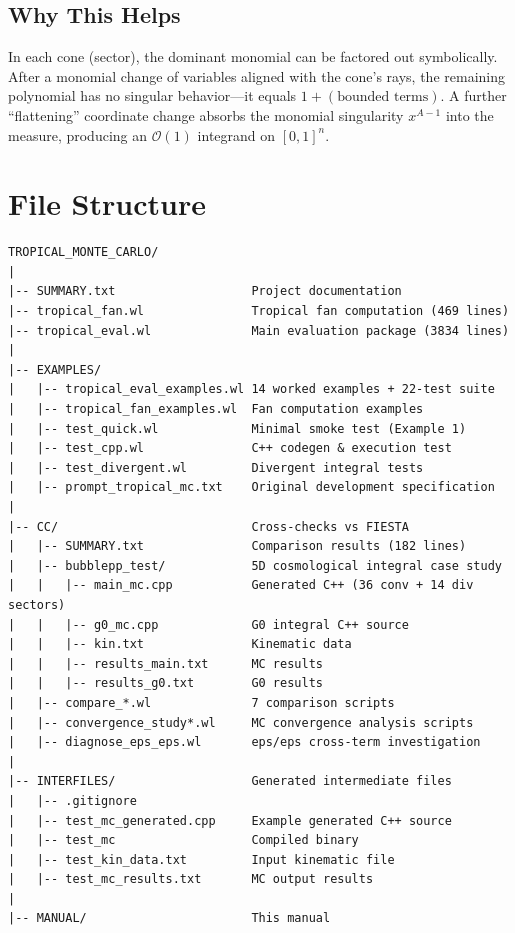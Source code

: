 \documentclass[11pt,a4paper]{article}
\begin{document}
\subsection{Why This Helps}

In each cone (sector), the dominant monomial can be factored out symbolically. After a monomial change of variables aligned with the cone's rays, the remaining polynomial has no singular behavior---it equals $1 + (\text{bounded terms})$. A further ``flattening'' coordinate change absorbs the monomial singularity $x^{A-1}$ into the measure, producing an $\mathcal{O}(1)$ integrand on $[0,1]^n$.

\section{File Structure}

\begin{lstlisting}
TROPICAL_MONTE_CARLO/
|
|-- SUMMARY.txt                   Project documentation
|-- tropical_fan.wl               Tropical fan computation (469 lines)
|-- tropical_eval.wl              Main evaluation package (3834 lines)
|
|-- EXAMPLES/
|   |-- tropical_eval_examples.wl 14 worked examples + 22-test suite
|   |-- tropical_fan_examples.wl  Fan computation examples
|   |-- test_quick.wl             Minimal smoke test (Example 1)
|   |-- test_cpp.wl               C++ codegen & execution test
|   |-- test_divergent.wl         Divergent integral tests
|   |-- prompt_tropical_mc.txt    Original development specification
|
|-- CC/                           Cross-checks vs FIESTA
|   |-- SUMMARY.txt               Comparison results (182 lines)
|   |-- bubblepp_test/            5D cosmological integral case study
|   |   |-- main_mc.cpp           Generated C++ (36 conv + 14 div sectors)
|   |   |-- g0_mc.cpp             G0 integral C++ source
|   |   |-- kin.txt               Kinematic data
|   |   |-- results_main.txt      MC results
|   |   |-- results_g0.txt        G0 results
|   |-- compare_*.wl              7 comparison scripts
|   |-- convergence_study*.wl     MC convergence analysis scripts
|   |-- diagnose_eps_eps.wl       eps/eps cross-term investigation
|
|-- INTERFILES/                   Generated intermediate files
|   |-- .gitignore
|   |-- test_mc_generated.cpp     Example generated C++ source
|   |-- test_mc                   Compiled binary
|   |-- test_kin_data.txt         Input kinematic file
|   |-- test_mc_results.txt       MC output results
|
|-- MANUAL/                       This manual
\end{lstlisting}
\end{document}
